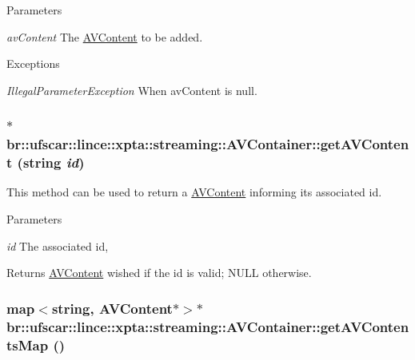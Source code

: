 \begin{DoxyParams}{Parameters}
\item[{\em avContent}]The \hyperlink{classbr_1_1ufscar_1_1lince_1_1xpta_1_1streaming_1_1AVContent}{AVContent} to be added. \end{DoxyParams}

\begin{DoxyExceptions}{Exceptions}
\item[{\em IllegalParameterException}]When avContent is null. \end{DoxyExceptions}
\hypertarget{classbr_1_1ufscar_1_1lince_1_1xpta_1_1streaming_1_1AVContainer_ab51eec9b187ee82743e8b63c4db28a1b}{
\subsubsection[{getAVContent}]{$\ast$ br::ufscar::lince::xpta::streaming::AVContainer::getAVContent (string {\em id})}}
\label{classbr_1_1ufscar_1_1lince_1_1xpta_1_1streaming_1_1AVContainer_ab51eec9b187ee82743e8b63c4db28a1b}


This method can be used to return a \hyperlink{classbr_1_1ufscar_1_1lince_1_1xpta_1_1streaming_1_1AVContent}{AVContent} informing its associated id. 


\begin{DoxyParams}{Parameters}
\item[{\em id}]The associated id, \end{DoxyParams}
\begin{DoxyReturn}{Returns}
\hyperlink{classbr_1_1ufscar_1_1lince_1_1xpta_1_1streaming_1_1AVContent}{AVContent} wished if the id is valid; NULL otherwise. 
\end{DoxyReturn}
\hypertarget{classbr_1_1ufscar_1_1lince_1_1xpta_1_1streaming_1_1AVContainer_a7979a7cb5edc974b9036eb868aeca5a6}{
\subsubsection[{getAVContentsMap}]{\setlength{\rightskip}{0pt plus 5cm}map$<$string, {\bf AVContent}$\ast$$>$$\ast$ br::ufscar::lince::xpta::streaming::AVContainer::getAVContentsMap ()}}
\label{classbr_1_1ufscar_1_1lince_1_1xpta_1_1streaming_1_1AVContainer_a7979a7cb5edc974b9036eb868aeca5a6}


